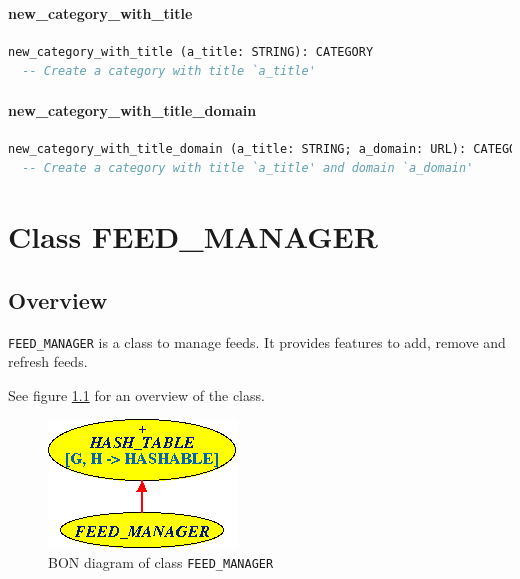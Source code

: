 \subsubsection{new\_category\_with\_title}

\begin{lstlisting}[language=Eiffel]
new_category_with_title (a_title: STRING): CATEGORY
  -- Create a category with title `a_title'
\end{lstlisting}


\subsubsection{new\_category\_with\_title\_domain}

\begin{lstlisting}[language=Eiffel]
new_category_with_title_domain (a_title: STRING; a_domain: URL): CATEGORY
  -- Create a category with title `a_title' and domain `a_domain'
\end{lstlisting}


\chapter{Class FEED\_MANAGER}
\label{cha:feed-manager}

\section{Overview}
\label{sec:feed-manager-overview}

\texttt{FEED\_MANAGER} is a class to manage feeds. It provides
features to add, remove and refresh feeds.

See figure \ref{fig:feed-manager} for an overview of the class.

\begin{figure}[htbp]
  \centering
  \includegraphics[scale=.6]{./figures/FEED_MANAGER}
  \caption{BON diagram of class \texttt{FEED\_MANAGER}}
  \label{fig:feed-manager}
\end{figure}


